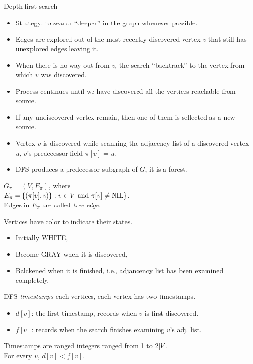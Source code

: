 \documentclass{beamer}
\begin{document}
\begin{frame}{}

\centerline{\large Depth-first search}
\begin{small}
\begin{itemize}
\item Strategy: to search ``deeper'' in the graph whenever possible.  
\item Edges are explored out of the most recently discovered
 vertex $v$ that still has unexplored edges leaving it.  
\item When there is no way out from $v$, the search ``backtrack'' to the vertex
from which $v$ was discovered. 
\item Process continues until we have discovered all the vertices
 reachable from source.  
\item If any undiscovered vertex remain, then one of them is sellected as a new
 source.  
\end{itemize}
\end{small}
\end{frame}

\begin{frame}{}

\begin{itemize}
\item Vertex $v$ is discovered while scanning the adjacency list of a discovered
 vertex $u$, $v$'s predecessor field $\pi[v]=u$.  
\item DFS produces a predecessor subgraph of $G$, it is a forest.  
\end{itemize}
$G_\pi = (V,E_\pi)$, where \\
$E_\pi=\{(\pi[v],v)\} : v\in V {\rm \ and \ } \pi[v]\ne {\rm NIL}\}$.  \\
Edges in $E_{\pi}$ are called {\it tree edge}.  
\end{frame}

\begin{frame}{}

Vertices have color to indicate their states.
\begin{itemize}
\item Initially WHITE,
\item Become GRAY when it is discovered,
\item Balckened when it is finished, i.e., adjancency list has been
 examined completely.   
\end{itemize}
\end{frame}

\begin{frame}{}

DFS {\it timestamps} each vertices, each vertex has two timestamps.
\begin{itemize}
\item $d[v]$: the first timestamp, records when $v$ is first discovered.
\item $f[v]$: records when the search finishes examining $v$'s adj. list. 
\end{itemize}
Timestamps are ranged integers ranged from 1 to $2|V|$. \\
For every $v$, $d[v]<f[v]$.  
\end{frame}
\end{document}

